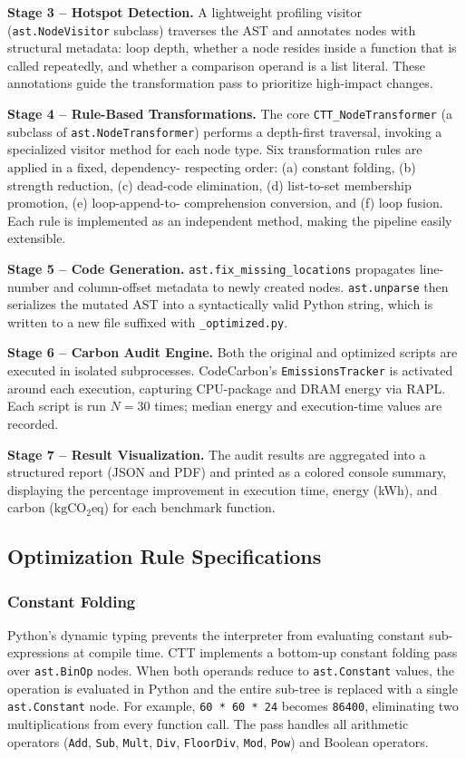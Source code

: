 \documentclass[conference]{IEEEtran}
\begin{document}
\textbf{Stage 3 -- Hotspot Detection.}
A lightweight profiling visitor (\texttt{ast.NodeVisitor} subclass)
traverses the AST and annotates nodes with structural metadata: loop depth,
whether a node resides inside a function that is called repeatedly, and
whether a comparison operand is a list literal.  These annotations guide
the transformation pass to prioritize high-impact changes.

\textbf{Stage 4 -- Rule-Based Transformations.}
The core \texttt{CTT\_NodeTransformer} (a subclass of \texttt{ast.NodeTransformer})
performs a depth-first traversal, invoking a specialized visitor method for
each node type.  Six transformation rules are applied in a fixed, dependency-
respecting order: (a) constant folding, (b) strength reduction, (c) dead-code
elimination, (d) list-to-set membership promotion, (e) loop-append-to-
comprehension conversion, and (f) loop fusion.  Each rule is implemented as
an independent method, making the pipeline easily extensible.

\textbf{Stage 5 -- Code Generation.}
\texttt{ast.fix\_missing\_locations} propagates line-number and column-offset
metadata to newly created nodes.  \texttt{ast.unparse} then serializes the
mutated AST into a syntactically valid Python string, which is written to a
new file suffixed with \texttt{\_optimized.py}.

\textbf{Stage 6 -- Carbon Audit Engine.}
Both the original and optimized scripts are executed in isolated subprocesses.
CodeCarbon's \texttt{EmissionsTracker} is activated around each execution,
capturing CPU-package and DRAM energy via RAPL.  Each script is run $N = 30$
times; median energy and execution-time values are recorded.

\textbf{Stage 7 -- Result Visualization.}
The audit results are aggregated into a structured report (JSON and PDF) and
printed as a colored console summary, displaying the percentage improvement
in execution time, energy (kWh), and carbon ($\mathrm{kgCO_2eq}$) for each
benchmark function.

\subsection{Optimization Rule Specifications}

\subsubsection{Constant Folding}
Python's dynamic typing prevents the interpreter from evaluating constant
sub-expressions at compile time.  CTT implements a bottom-up constant
folding pass over \texttt{ast.BinOp} nodes.  When both operands reduce to
\texttt{ast.Constant} values, the operation is evaluated in Python and the
entire sub-tree is replaced with a single \texttt{ast.Constant} node.  For
example, \texttt{60 * 60 * 24} becomes \texttt{86400}, eliminating two
multiplications from every function call.  The pass handles all arithmetic
operators (\texttt{Add}, \texttt{Sub}, \texttt{Mult}, \texttt{Div},
\texttt{FloorDiv}, \texttt{Mod}, \texttt{Pow}) and Boolean operators.
\end{document}
